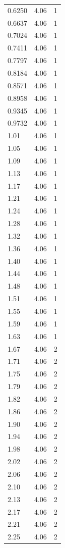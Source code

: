 \begin{longtable}{lrr}
  0.6250 & 4.06 & 1 \\
  0.6637 & 4.06 & 1 \\
  0.7024 & 4.06 & 1 \\
  0.7411 & 4.06 & 1 \\
  0.7797 & 4.06 & 1 \\
  0.8184 & 4.06 & 1 \\
  0.8571 & 4.06 & 1 \\
  0.8958 & 4.06 & 1 \\
  0.9345 & 4.06 & 1 \\
  0.9732 & 4.06 & 1 \\
  1.01 & 4.06 & 1 \\
  1.05 & 4.06 & 1 \\
  1.09 & 4.06 & 1 \\
  1.13 & 4.06 & 1 \\
  1.17 & 4.06 & 1 \\
  1.21 & 4.06 & 1 \\
  1.24 & 4.06 & 1 \\
  1.28 & 4.06 & 1 \\
  1.32 & 4.06 & 1 \\
  1.36 & 4.06 & 1 \\
  1.40 & 4.06 & 1 \\
  1.44 & 4.06 & 1 \\
  1.48 & 4.06 & 1 \\
  1.51 & 4.06 & 1 \\
  1.55 & 4.06 & 1 \\
  1.59 & 4.06 & 1 \\
  1.63 & 4.06 & 1 \\
  1.67 & 4.06 & 2 \\
  1.71 & 4.06 & 2 \\
  1.75 & 4.06 & 2 \\
  1.79 & 4.06 & 2 \\
  1.82 & 4.06 & 2 \\
  1.86 & 4.06 & 2 \\
  1.90 & 4.06 & 2 \\
  1.94 & 4.06 & 2 \\
  1.98 & 4.06 & 2 \\
  2.02 & 4.06 & 2 \\
  2.06 & 4.06 & 2 \\
  2.10 & 4.06 & 2 \\
  2.13 & 4.06 & 2 \\
  2.17 & 4.06 & 2 \\
  2.21 & 4.06 & 2 \\
  2.25 & 4.06 & 2 \\

\end{longtable}
